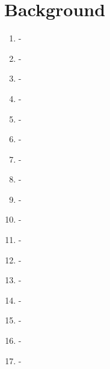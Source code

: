 \chapter{Background}
\begin{enumerate}
    \item \cite{PAUNACristian2018ATSf} - %
    \item \cite{MakarovIgor2020Taai} - %
    \item \cite{HuangJianfeng2022Taaf} - %
    \item \cite{alma991000411969901591} - %
    \item \cite{byrneexploration} - %
    \item \cite{6974093} - %
    \item \cite{https://doi.org/10.1111/joes.12153} - %
    \item \cite{KRAUSS2017689} - %
    \item \cite{2019} - %
    \item \cite{dempsey_market_2017} - %
    \item \cite{mo_theoretical_nodate} - %
    \item \cite{crepelliere_arbitrage_2022} - %
    \item \cite{wang_cyclic_2022} - %
    \item \cite{8957853} - %
    \item \cite{8450775} - %
    \item \cite{} - %
    \item \cite{alma991000607977501591} - %

\end{enumerate}
